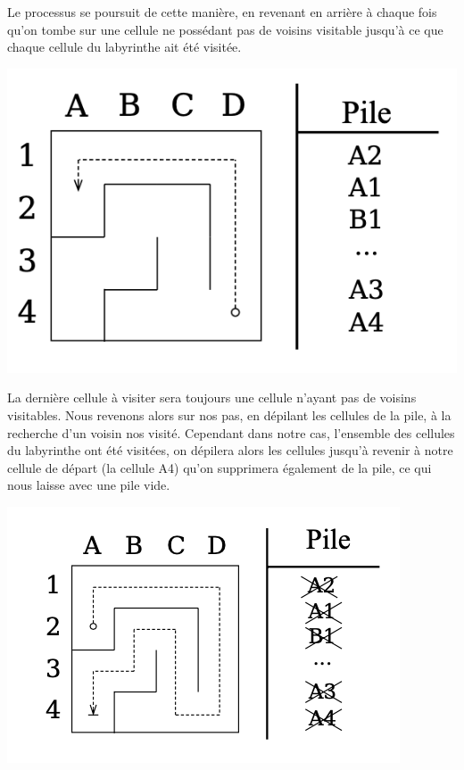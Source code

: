 \begin{minipage}{0.6\textwidth}
Le processus se poursuit de cette manière, en revenant en arrière à chaque fois qu'on tombe sur une cellule ne possédant pas de voisins visitable jusqu'à ce que chaque cellule du labyrinthe ait été visitée.
\end{minipage}
\begin{minipage}{0.4\textwidth}
\includegraphics[width=\linewidth]{report/pics/backtracking7.png}
\end{minipage}


\begin{minipage}{0.6\textwidth}
La dernière cellule à visiter sera toujours une cellule n'ayant pas de voisins visitables. Nous revenons alors sur nos pas, en dépilant les cellules de la pile, à la recherche d'un voisin nos visité. Cependant dans notre cas, l'ensemble des cellules du labyrinthe ont été visitées, on dépilera alors les cellules jusqu'à revenir à notre cellule de départ (la cellule A4) qu'on supprimera également de la pile, ce qui nous laisse avec une pile vide.
\end{minipage}
\begin{minipage}{0.4\textwidth}
\includegraphics[width=\linewidth]{report/pics/backtracking9.png}
\end{minipage}

